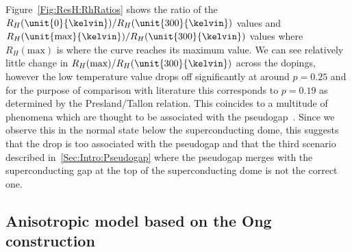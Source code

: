 Figure~\ref{Fig:ResH:RhRatios} shows the ratio of the $R_H(\unit{0}{\kelvin})/R_H(\unit{300}{\kelvin})$ values and $R_H(\unit{\textrm{max}}{\kelvin})/R_H(\unit{300}{\kelvin})$ values where $R_H(\textrm{max})$ is where the curve reaches its maximum value. We can see relatively little change in $R_H(\textrm{max})/R_H(\unit{300}{\kelvin})$ across the dopings, however the low temperature value drops off significantly at around $p= 0.25$ and for the purpose of comparison with literature this corresponds to $p=0.19$ as determined by the Presland/Tallon relation. This coincides to a multitude of phenomena which are thought to be associated with the pseudogap~\cite{Tallon2001}. Since we observe this in the normal state below the superconducting dome, this suggests that the drop is too associated with the pseudogap and that the third scenario described in~\ref{Sec:Intro:Pseudogap} where the pseudogap merges with the superconducting gap at the top of the superconducting dome is not the correct one.


\subsection{Anisotropic model based on the Ong construction}


